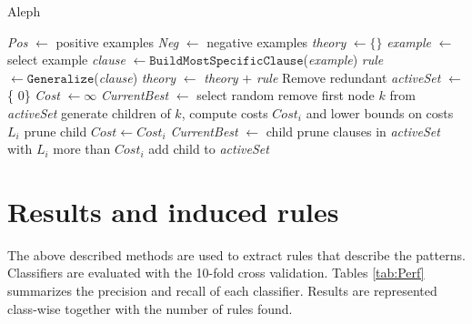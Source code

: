 \begin{algorithm}
	\caption{Aleph}
	\label{alg:Aleph}
	\begin{algorithmic}[1]
			\State \textit{Pos} $\gets$ positive examples
			\State \textit{Neg} $\gets$ negative examples
			\State \textit{theory} $\gets \{ \}$
				\State \textit{example} $\gets$ select example
				\State \textit{clause} $\gets \mathtt{BuildMostSpecificClause}$(\textit{example}) 
				\State \textit{rule} $\gets \mathtt{Generalize}$(\textit{clause})
				\State \textit{theory} $\gets$ \textit{theory} $+$ \textit{rule}
				\State Remove redundant
			\EndWhile
		\EndFunction
		\Statex
			\State \textit{activeSet} $\gets$ \{ 0\}
			\State \textit{Cost} $\gets \infty $
			\State \textit{CurrentBest} $\gets$ select random
				\State remove first node $k$ from \textit{activeSet}
				\State generate children of $k$, compute costs $Cost_i$ and lower bounds on costs $L_i$
						\State prune child
					\Else						
							\State $Cost \gets Cost_i$
							\State \textit{CurrentBest} $\gets$ child
							\State prune clauses in \textit{activeSet} with $L_i$ more than $Cost_i$ 
						\EndIf
						\State add child to \textit{activeSet}
					\EndIf
				\EndFor
			\EndWhile 
		\EndFunction
	\end{algorithmic}
\end{algorithm}


\section{Results and induced rules}

The above described methods are used to extract rules that describe the patterns. Classifiers are evaluated with the 10-fold cross validation. Tables \ref{tab:Perf} summarizes the precision and recall of each classifier. Results are represented class-wise together with the number of rules found. \\

